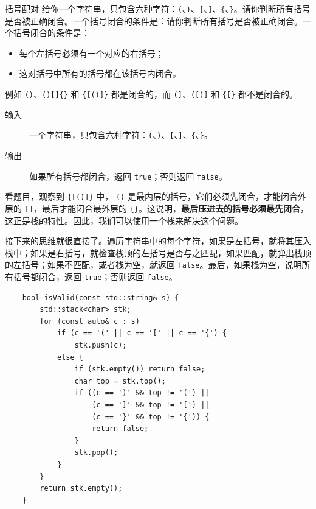 \begin{example}{括号配对}{}
    给你一个字符串，只包含六种字符：\verb|(|、\verb|)|、\verb|[|、\verb|]|、\verb|{|、\verb|}|。请你判断所有括号是否被正确闭合。一个括号闭合的条件是：请你判断所有括号是否被正确闭合。一个括号闭合的条件是：
    \begin{itemize}
        \item 每个左括号必须有一个对应的右括号；
        \item 这对括号中所有的括号都在该括号内闭合。
    \end{itemize}
    例如 \verb|()|、\verb|()[]{}| 和 \verb|{[()]}| 都是闭合的，而 \verb|(]|、\verb|([)]| 和 \verb|{[}| 都不是闭合的。
    \begin{description}
        \item[输入] 一个字符串，只包含六种字符：\verb|(|、\verb|)|、\verb|[|、\verb|]|、\verb|{|、\verb|}|。
        \item[输出] 如果所有括号都闭合，返回 \verb|true|；否则返回 \verb|false|。
    \end{description}
    \tcblower
    看题目，观察到 \verb|{[()]}| 中， \verb|()| 是最内层的括号，它们必须先闭合，才能闭合外层的 \verb|[]|，最后才能闭合最外层的 \verb|{}|。这说明，\textbf{最后压进去的括号必须最先闭合}，这正是栈的特性。因此，我们可以使用一个栈来解决这个问题。
    
    接下来的思维就很直接了。遍历字符串中的每个字符，如果是左括号，就将其压入栈中；如果是右括号，就检查栈顶的左括号是否与之匹配，如果匹配，就弹出栈顶的左括号；如果不匹配，或者栈为空，就返回 \verb|false|。最后，如果栈为空，说明所有括号都闭合，返回 \verb|true|；否则返回 \verb|false|。
    \begin{verbatim}
    bool isValid(const std::string& s) {
        std::stack<char> stk;
        for (const auto& c : s)
            if (c == '(' || c == '[' || c == '{') {
                stk.push(c);
            else {
                if (stk.empty()) return false;
                char top = stk.top();
                if ((c == ')' && top != '(') ||
                    (c == ']' && top != '[') ||
                    (c == '}' && top != '{')) {
                    return false;
                }
                stk.pop();
            }
        }
        return stk.empty();
    }
    \end{verbatim}
\end{example}

